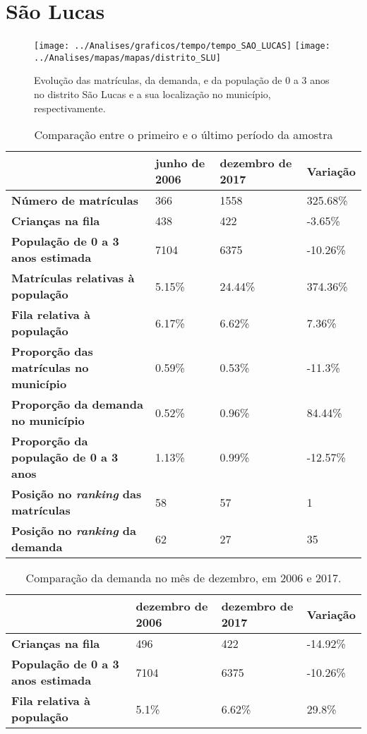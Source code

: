 \section{São Lucas}
\begin{figure}[H]
	\centering
	\texttt{[image: ../Analises/graficos/tempo/tempo\_SAO\_LUCAS]}
	\texttt{[image: ../Analises/mapas/mapas/distrito\_SLU]}
	\caption{Evolução das matrículas, da demanda, e da população de 0 a 3 anos no distrito São Lucas e a sua localização no município, respectivamente.}
\end{figure}
\begin{table}[H]
	\begin{tabular}{|l|l|l|l|}
		\hline
		\textbf{}                                      & \textbf{junho de 2006}       & \textbf{dezembro de 2017}    & \textbf{Variação} \\ \hline
		\textbf{Número de matrículas}                  & 366 & 1558 & 325.68\% \\ \hline
		\textbf{Crianças na fila}                      & 438 & 422 & -3.65\% \\ \hline
		\textbf{População de 0 a 3 anos estimada}      & 7104 & 6375 & -10.26\% \\ \hline
		\textbf{Matrículas relativas à população}      & 5.15\% & 24.44\% & 374.36\% \\ \hline
		\textbf{Fila relativa à população}             & 6.17\% & 6.62\% & 7.36\% \\ \hline
		\textbf{Proporção das matrículas no município} & 0.59\% & 0.53\% & -11.3\% \\ \hline
		\textbf{Proporção da demanda no município}     & 0.52\% & 0.96\% & 84.44\% \\ \hline
		\textbf{Proporção da população de 0 a 3 anos}  & 1.13\% & 0.99\% & -12.57\% \\ \hline
		\textbf{Posição no \textit{ranking} das matrículas}     & 58 & 57 & 1 \\ \hline
		\textbf{Posição no \textit{ranking} da demanda}         & 62 & 27 & 35 \\ \hline
	\end{tabular}
	\caption{Comparação entre o primeiro e o último período da amostra}
\end{table}
\begin{table}[H]
	\begin{tabular}{|l|l|l|l|}
		\hline
		\textbf{}                                 & \textbf{dezembro de 2006} & \textbf{dezembro de 2017} & \textbf{Variação} \\ \hline
		\textbf{Crianças na fila}                      & 496 & 422 & -14.92\% \\ \hline
		\textbf{População de 0 a 3 anos estimada}      & 7104 & 6375 & -10.26\% \\ \hline
		\textbf{Fila relativa à população}             & 5.1\% & 6.62\% & 29.8\% \\ \hline
	\end{tabular}
	\caption{Comparação da demanda no mês de dezembro, em 2006 e 2017.}
\end{table}
